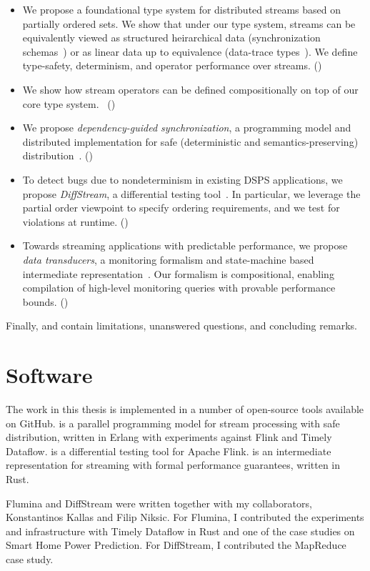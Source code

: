 \begin{itemize}
\item
We propose a foundational type system for distributed streams based on partially ordered sets.
We show that under our type system, streams can be equivalently viewed as structured heirarchical data (synchronization schemas~) or as linear data up to equivalence (data-trace types~).
We define type-safety, determinism, and operator performance over streams. ()

\item
We show how stream operators can be defined compositionally on top of our core type system.~ ()

\item
We propose \emph{dependency-guided synchronization},
a programming model and distributed implementation for safe (deterministic and semantics-preserving) distribution~.
()

\item
To detect bugs due to nondeterminism in existing DSPS applications,
we propose \emph{DiffStream}, a differential testing tool~.
In particular, we leverage the partial order viewpoint to specify
ordering requirements, and we test for violations at runtime.
()

\item
Towards streaming applications with predictable performance,
we propose \emph{data transducers}, a monitoring formalism and state-machine based intermediate representation~.
Our formalism is compositional, enabling compilation of high-level
monitoring queries with provable performance bounds.
()
\end{itemize}

Finally,  and  contain limitations, unanswered questions, and concluding remarks.

\section{Software}

The work in this thesis is implemented in a number of open-source tools available on GitHub.
 is a parallel programming model for stream processing with safe distribution, written in Erlang with experiments against Flink and Timely Dataflow.
 is a differential testing tool for Apache Flink.
 is an intermediate representation for streaming with formal performance guarantees, written in Rust.

Flumina and DiffStream were written together with my collaborators, Konstantinos Kallas and Filip Niksic.
For Flumina, I contributed the experiments and infrastructure with Timely Dataflow in Rust and one of the case studies on Smart Home Power Prediction.
For DiffStream, I contributed the MapReduce case study.

